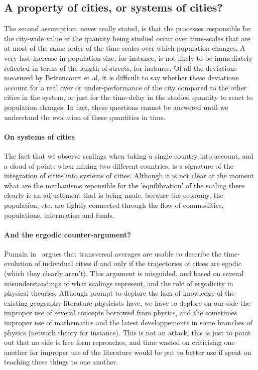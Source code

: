 \subsection{A property of cities, or systems of cities?}
\label{sub:a_property_of_cities_or_systems_of_cities_}



The second assumption, never really stated, is that the
processes responsible for the city-wide value of the quantity being studied
occur over time-scales that are at most of the same order of the time-scales
over which population changes. A very fast increase in population size, for
instance, is not likely to be immediately reflected in terms of the length of
streets, for instance. Of all the deviations measured by Bettencourt et al, it
is difficult to say whether these deviations account for a real over or
under-performance of the city compared to the other cities in the system, or
just for the time-delay in the studied quantity to react to population
changes. In fact, these questions cannot be answered until we understand the
evolution of these quantities in time.

\paragraph{On systems of cities} The fact that we observe scalings when taking a
single country into account, and a cloud of points when mixing two different
countries, is a signature of the integration of cities into systems of
cities. Although it is not clear at the moment what are the mechanisms
reponsible for the 'equilibration' of the scaling there clearly is an
adjustement that is being made, because the economy, the population, etc. are
tightly connected through the flow of commodities, populations, information and
funds.

\paragraph{And the ergodic counter-argument?} Pumain in~\cite{Pumain:2012} argues that
transversal averages are usable to describe the time-evolution of individual
cities if and only if the trajectories of cities are egodic (which they clearly
aren't). This argument is misguided, and based on several misunderstandings of
what scalings represent, and the role of ergodicity in physical theories.
Although prompt to deplore the lack of knowledge of the existing geography
literature physicists have, we have to deplore on our side the improper use of
several concepts borrowed from physics, and the sometimes improper use of
mathematics and the latest developpements in some branches of physics (network
theory for instance). This is not an attack, this is just to point out that no
side is free form reproaches, and time wasted on criticising one another for
improper use of the literature would be put to better use if spent on teaching
these things to one another.

